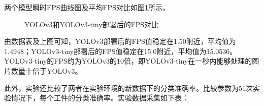 两个模型瞬时FPS曲线图及平均FPS对比如图\ref{fig:FPS}所示。


\begin{figure}[h]
    \centering
    \caption{YOLOv3和YOLOv3-tiny部署后的FPS对比}
    \label{fig:FPS}
\end{figure}

由数据表及上图可知，YOLOv3部署后的FPS值稳定在1.50附近，平均值为1.4948；YOLOv3-tiny部署后的FPS值稳定在15.0附近，平均值为15.0536。
YOLOv3-tiny的FPS约为YOLOv3的10倍，即YOLOv3-tiny在一秒内能够处理的图片数量十倍于YOLOv3。

此外，实验还比较了两者在实验环境的新数据下的分类准确率。比较参数为51次实验情况下，每个工件的分类准确率。实验数据采集如下表：


